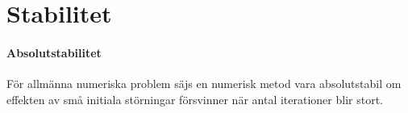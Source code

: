 \section{Stabilitet}

\paragraph{Absolutstabilitet}
För allmänna numeriska problem säjs en numerisk metod vara absolutstabil om effekten av små initiala störningar försvinner när antal iterationer blir stort.